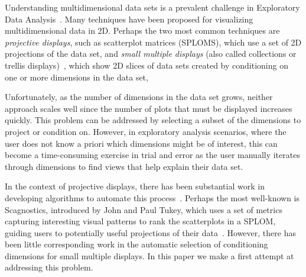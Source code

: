 

Understanding multidimensional data sets is a prevalent challenge in Exploratory Data Analysis~\cite{Tukey1977}. Many techniques have been proposed for visualizing multidimensional data in 2D. Perhaps the two most common techniques are
\emph{projective displays}, such as scatterplot matrices (SPLOMS), which use a set of 2D projections of the data set,
and \emph{small multiple displays} (also called collections or trellis displays)~\cite{Bertin1983, tufte1986, Becker1996}, which show 2D slices of data sets created by conditioning on one or more dimensions in the data set,

Unfortunately, as the number of dimensions in the data set grows, neither approach scales well since the number of plots that must be displayed increases quickly. This problem can be addressed by selecting a subset of the dimensions to project or condition on. However, in exploratory analysis scenarios, where the user does not know a priori which dimensions might be of interest, this can become a time-consuming exercise in trial and error as the user manually iterates through dimensions to find views that help explain their data set. 

In the context of projective displays, there has been substantial work in developing algorithms to automate this process~\cite{Seo2005,Wilkinson2005,Sips2009}.
Perhaps the most well-known is Scagnostics, introduced by John and Paul Tukey, which uses a set of metrics capturing interesting visual patterns to rank the scatterplots in a SPLOM, guiding users to potentially useful projections of their data~\cite{}.
However, there has been little corresponding work in the automatic selection of conditioning dimensions for small multiple displays. In this paper we make a first attempt at addressing this problem.

